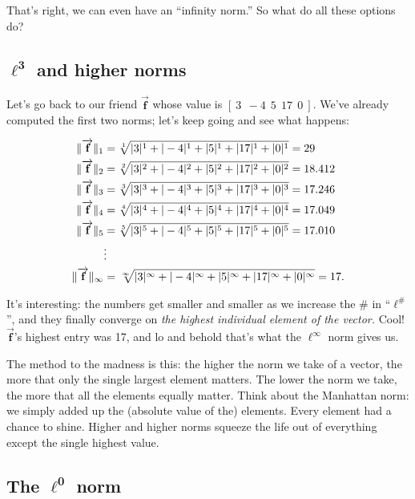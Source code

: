 That's right, we can even have an ``infinity norm.'' So what do all these options do?


\subsection{$\boldsymbol\ell^\textbf{3}$ and higher norms}

Let's go back to our friend $\overrightarrow{\textbf{f}}$ whose value
is $[\ 3\ \ -4\ \ 5\ \ 17\ \ 0\ ]$. We've already computed the first two norms;
let's keep going and see what happens:

\vspace{-.15in}
\begin{align*}
\lVert\overrightarrow{\textbf{f}}\rVert_1 &= \sqrt[1]{|3|^1 + |-4|^1 + |5|^1 + |17|^1 + |0|^1} = 29\\
\lVert\overrightarrow{\textbf{f}}\rVert_2 &= \sqrt[2]{|3|^2 + |-4|^2 + |5|^2 + |17|^2 + |0|^2} = 18.412\\
\lVert\overrightarrow{\textbf{f}}\rVert_3 &= \sqrt[3]{|3|^3 + |-4|^3 + |5|^3 + |17|^3 + |0|^3} = 17.246\\
\lVert\overrightarrow{\textbf{f}}\rVert_4 &= \sqrt[4]{|3|^4 + |-4|^4 + |5|^4 + |17|^4 + |0|^4} = 17.049\\
\lVert\overrightarrow{\textbf{f}}\rVert_5 &= \sqrt[5]{|3|^5 + |-4|^5 + |5|^5 + |17|^5 + |0|^5} = 17.010\\
& \vdots \\
\lVert\overrightarrow{\textbf{f}}\rVert_\infty &= \sqrt[\infty]{|3|^\infty + |-4|^\infty + |5|^\infty + |17|^\infty + |0|^\infty} = 17.\\
\end{align*}

It's interesting: the numbers get smaller and smaller as we increase the \# in
``$\ell^{\#}$'', and they finally converge on \textit{the highest individual
element of the vector.} Cool! $\overrightarrow{\textbf{f}}$'s highest entry was
17, and lo and behold that's what the $\ell^\infty$ norm gives us.

The method to the madness is this: the higher the norm we take of a vector, the
more that only the single largest element matters. The lower the norm we take,
the more that all the elements equally matter. Think about the Manhattan norm:
we simply added up the (absolute value of the) elements. Every element had a
chance to shine. Higher and higher norms squeeze the life out of everything
except the single highest value.

\subsection{The $\boldsymbol\ell^\textbf{0}$ norm}

